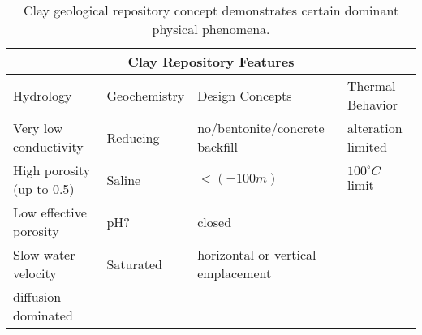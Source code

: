 %
\begin{table}[h!]
  \centering
  \footnotesize{
  \begin{tabular}{|l|l|l|l|}
    \multicolumn{4}{c}{\textbf{Clay Repository Features}}\\
    \hline
     Hydrology & Geochemistry & Design Concepts & Thermal Behavior \\ 
    \hline
    Very low conductivity&Reducing&no/bentonite/concrete backfill &alteration limited\\
    High porosity (up to 0.5)&Saline&$<(-100m)$&$100^\circ C$ limit \\
    Low effective porosity&pH?&closed&\\
    Slow water velocity &Saturated&horizontal or vertical emplacement&\\
    diffusion dominated &&&\\
    \hline
  \end{tabular}
  \caption[Clay Repository Features]{Clay geological repository 
  concept demonstrates certain dominant physical phenomena. }
  \label{tab:clay_tab}
  }
\end{table}


